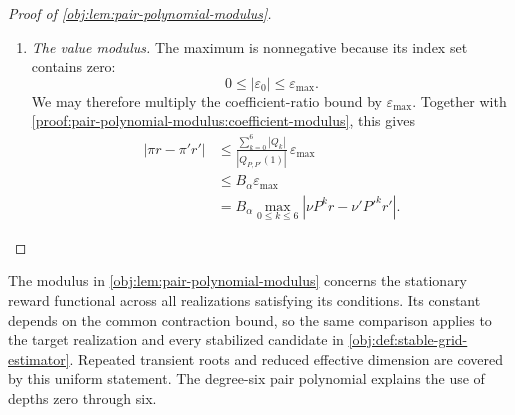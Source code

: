 \documentclass[11pt]{article}
\begin{document}
\begin{proof}[Proof of \cref{obj:lem:pair-polynomial-modulus}]
\begin{enumerate}
For the denominator, the reverse triangle inequality gives
\[
|1-\xi_\ell|
\ge1-|\xi_\ell|
\ge1-\alpha>0
\qquad(1\le\ell\le6).
\]
The empty product equals one. Successively multiplying the nonnegative
distance bounds gives, by induction,
\[
\prod_{\ell=1}^{n_{\mathrm{root}}}|1-\xi_\ell|
\ge(1-\alpha)^{n_{\mathrm{root}}}
\qquad
(n_{\mathrm{root}}\in\{0,\ldots,6\}).
\]
Indeed, for \(n_{\mathrm{root}}<6\), the induction step is
\[
\begin{aligned}
\prod_{\ell=1}^{n_{\mathrm{root}}+1}|1-\xi_\ell|
&=|1-\xi_{n_{\mathrm{root}}+1}|
       \prod_{\ell=1}^{n_{\mathrm{root}}}|1-\xi_\ell|\\
&\ge(1-\alpha)
       \prod_{\ell=1}^{n_{\mathrm{root}}}|1-\xi_\ell|\\
&\ge(1-\alpha)^{n_{\mathrm{root}}+1}.
\end{aligned}
\]
Evaluating the root factorization at one consequently gives
\[
|Q_{P,P'}(1)|
=\prod_{\ell=1}^6|1-\xi_\ell|
\ge(1-\alpha)^6>0.
\]

Combining the numerator and denominator bounds, with positive denominators,
proves
\[
\frac{\sum_{k=0}^6|Q_k|}{|Q_{P,P'}(1)|}
\le\frac{(1+\alpha)^6}{(1-\alpha)^6}
=\left(\frac{1+\alpha}{1-\alpha}\right)^6
=B_\alpha.
\]

\item \emph{The value modulus.}
The maximum is nonnegative because its index set contains zero:
\[
0\le|\varepsilon_0|\le\varepsilon_{\max}.
\]
We may therefore multiply the coefficient-ratio bound by
\(\varepsilon_{\max}\). Together with \cref{proof:pair-polynomial-modulus:coefficient-modulus}, this gives
\[
\begin{aligned}
|\pi r-\pi'r'|
&\le
\frac{\sum_{k=0}^6|Q_k|}{|Q_{P,P'}(1)|}\,
\varepsilon_{\max}\\
&\le B_\alpha\varepsilon_{\max}\\
&=B_\alpha
  \max_{0\le k\le6}|\nu P^kr-\nu'P'^kr'|.
\end{aligned}
\]
\end{enumerate}
\end{proof}

The modulus in \cref{obj:lem:pair-polynomial-modulus} concerns the stationary reward functional across all realizations satisfying its conditions. Its constant depends on the common contraction bound, so the same comparison applies to the target realization and every stabilized candidate in \cref{obj:def:stable-grid-estimator}. Repeated transient roots and reduced effective dimension are covered by this uniform statement. The degree-six pair polynomial explains the use of depths zero through six.
\end{document}
